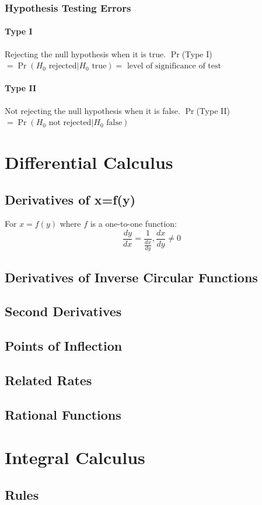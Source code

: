 \documentclass[a4paper,twoside]{article}
\begin{document}
			\subsubsection{Hypothesis Testing Errors}
				\paragraph{Type I} Rejecting the null hypothesis when it is true. $\Pr$(Type I)$=\Pr(H_0 \text{ rejected}|H_0 \text{ true})=\text{ level of significance of test}$
				\paragraph{Type II} Not rejecting the null hypothesis when it is false. $\Pr$(Type II)$=\Pr(H_0 \text{ not rejected}|H_0 \text{ false})$
	\section{Differential Calculus}			
		\subsection{Derivatives of x=f(y)}
			For $x=f(y)$ where $f$ is a one-to-one function:
			\[
				\frac{dy}{dx}=\frac{1}{\frac{dx}{dy}},\frac{dx}{dy}\neq0
			\]
		\subsection{Derivatives of Inverse Circular Functions}
		\subsection{Second Derivatives}
		\subsection{Points of Inflection}
		\subsection{Related Rates}
		\subsection{Rational Functions}
	\section{Integral Calculus}
		\subsection{Rules}
\end{document}
